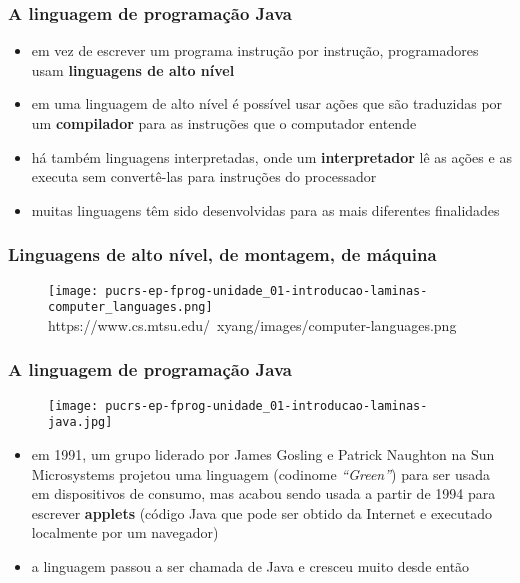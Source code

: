 \documentclass[aspectratio=169]{beamer}
\begin{document}
\begin{frame}\frametitle{A linguagem de programação Java}
\begin{itemize}
	\item em vez de escrever um programa instrução por instrução, programadores usam \textbf{linguagens de alto nível}
	\item em uma linguagem de alto nível é possível usar ações que são traduzidas por um \textbf{compilador} para as instruções que o computador entende
	\item há também linguagens interpretadas, onde um \textbf{interpretador} lê as ações e as executa sem convertê-las para instruções do processador
	\item muitas linguagens têm sido desenvolvidas para as mais diferentes finalidades
\end{itemize}
\end{frame}

\begin{frame}\frametitle{Linguagens de alto nível, de montagem, de máquina}
\begin{figure}[h]
	\centering
	\texttt{[image: pucrs-ep-fprog-unidade\_01-introducao-laminas-computer\_languages.png]}\\
	\tiny{https://www.cs.mtsu.edu/~xyang/images/computer-languages.png}
\end{figure}
\end{frame}
	
\begin{frame}\frametitle{A linguagem de programação Java}
\begin{figure}[h]
	\centering
	\texttt{[image: pucrs-ep-fprog-unidade\_01-introducao-laminas-java.jpg]}
\end{figure}
\begin{itemize}
	\item em 1991, um grupo liderado por James Gosling e Patrick Naughton na Sun Microsystems projetou uma linguagem (codinome \emph{``Green''}) para ser usada em dispositivos de consumo, mas acabou sendo usada a partir de 1994 para escrever \textbf{applets} (código Java que pode ser obtido da Internet e executado localmente por um navegador)
	\item a linguagem passou a ser chamada de Java e cresceu muito desde então
\end{itemize}
\end{frame}
\end{document}
